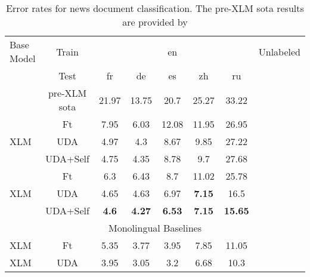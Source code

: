 \documentclass{article} \usepackage{iclr2020_conference,times}
\newcommand{\cmark}{\ding{51}}\newcommand{\xmark}{\ding{55}}\usepackage{hyperref}       \usepackage{url}            \usepackage{booktabs}       \usepackage[inline]{enumitem}
\begin{document}
\begin{table}[!ht]
\centering
    \begin{tabular}{l|c|ccccc|c}
        \toprule
        Base Model & Train         &       &       & en    &       &       & Unlabeled \\
        & Test          & fr    & de    & es    & zh    & ru    &           \\
        \midrule
        & pre-XLM sota & 21.97 & 13.75 & 20.7  & 25.27 & 33.22 & \xmark         \\
        \midrule
        & Ft            & 7.95  & 6.03  & 12.08 & 11.95 & 26.95 & \xmark          \\
        XLM        & UDA           & 4.97  & 4.3   & 8.67  & 9.85  & 27.22 & \cmark          \\
        & UDA+Self      & 4.75  & 4.35  &  8.78     & 9.7   & 27.68 & \cmark          \\
        \midrule
        & Ft            & 6.3   & 6.43  & 8.7   & 11.02 & 25.78 & \cmark          \\
        XLM     & UDA           & 4.65  & 4.63  & 6.97  & \textbf{7.15}  & 16.5  & \cmark          \\
        & UDA+Self      & \textbf{4.6}   & \textbf{4.27}  & \textbf{6.53}      & \textbf{7.15}  & \textbf{15.65} & \cmark  \\
        \midrule
        \midrule
        \multicolumn{8}{c}{Monolingual Baselines}  \\
        \midrule
        XLM & Ft & 5.35 & 3.77 & 3.95 & 7.85 & 11.05 &  \xmark \\
        \midrule 
        XLM & UDA &  3.95 & 3.05 & 3.2 & 6.68 & 10.3 &\cmark \\ 
        \bottomrule    
    \end{tabular}
    \caption{Error rates for news document classification. The pre-XLM sota results are provided by \cite{artetxe2018massively}}
\label{tab:news}
\end{table}
\end{document}
